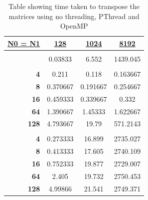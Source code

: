 \documentclass[10pt, conference]{IEEEtran}
\begin{document}
\begin{table}[h!]
\centering
\caption{Table showing time taken to transpose the matrices using no threading, PThread and OpenMP}
\label{Results}
\begin{tabular}{|r|c|c|c|}
\hline
\multicolumn{1}{|l|}{{\ul \textbf{N0 = N1}}} & {\ul \textbf{128}} & {\ul \textbf{1024}} & {\ul \textbf{8192}} \\ \hline
\multicolumn{4}{|c|}{\cellcolor[HTML]{C0C0C0}{\ul \textbf{No threading}}}                                     \\ \hline
\multicolumn{1}{|c|}{}                       & 0.03833            & 6.552               & 1439.045            \\ \hline
\multicolumn{4}{|c|}{\cellcolor[HTML]{C0C0C0}{\ul \textbf{PThread}}}                                          \\ \hline
\textbf{4}                                   & 0.211              & 0.118               & 0.163667            \\ \hline
\textbf{8}                                   & 0.370667           & 0.191667            & 0.254667            \\ \hline
\textbf{16}                                  & 0.459333           & 0.339667            & 0.332               \\ \hline
\textbf{64}                                  & 1.390667           & 1.45333             & 1.622667            \\ \hline
\textbf{128}                                 & 4.793667           & 19.79               & 571.2143            \\ \hline
\multicolumn{4}{|c|}{\cellcolor[HTML]{C0C0C0}{\ul \textbf{OpenMP}}}                                           \\ \hline
\textbf{4}                                   & 0.273333           & 16.899              & 2735.027            \\ \hline
\textbf{8}                                   & 0.413333           & 17.605              & 2740.109            \\ \hline
\textbf{16}                                  & 0.752333           & 19.877              & 2729.007            \\ \hline
\textbf{64}                                  & 2.405              & 19.732              & 2750.453            \\ \hline
\textbf{128}                                 & 4.99866            & 21.541              & 2749.371            \\ \hline
\end{tabular}
\end{table}
\end{document}

